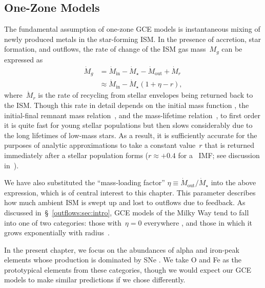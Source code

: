 \subsection{One-Zone Models}
\label{outflows:sec:gce:onezone}
The fundamental assumption of one-zone GCE models is instantaneous
mixing of newly produced metals in the star-forming ISM.
In the presence of accretion, star formation, and outflows, the rate of
change of the ISM gas mass~$M_g$ can be expressed as
\begin{equation}\begin{split}
\dot{M}_g &= \dot{M}_\text{in} - \dot{M}_\star - \dot{M}_\text{out} +
\dot{M}_r
\\
&\approx \dot{M}_\text{in} - \dot{M}_\star(1 + \eta - r),
\label{outflows:eq:mdot-gas}
\end{split}\end{equation}
where~$\dot{M}_r$ is the rate of recycling from stellar envelopes being
returned back to the ISM.
Though this rate in detail depends on the initial mass function
\citep[IMF; e.g.,][]{Salpeter1955, Kroupa2001, Chabrier2003}, the
initial-final remnant mass relation~\citep[e.g.,][]{Kalirai2008}, and the
mass-lifetime relation~\citep[e.g.,][]{Larson1974, Maeder1989, Hurley2000},
to first order it is quite fast for young stellar populations but then
slows considerably due to the long lifetimes of low-mass stars.
As a result, it is sufficiently accurate for the purposes of analytic
approximations to take a constant value~$r$ that is returned immediately
after a stellar population forms ($r \approx +0.4$ for
a~\citealt{Kroupa2001} IMF; see discussion in~\citealt{Weinberg2017b}).
\par
We have also substituted the ``mass-loading factor''
$\eta \equiv \dot{M}_\text{out} / \dot{M}_\star$ into the above expression,
which is of central interest to this chapter.
This parameter describes how much ambient ISM is swept up and lost to outflows
due to feedback.
As discussed in~\S~\ref{outflows:sec:intro}, GCE models of the Milky Way
tend to fall into one of two categories: those with~$\eta = 0$ everywhere
\citep[e.g.,][]{Spitoni2021}, and those in which it grows exponentially
with radius~\citep[e.g.,][]{Johnson2021}.
\par
In the present chapter, we focus on the abundances of alpha and
iron-peak elements whose production is dominated by SNe
\citep[e.g.,][]{Johnson2019}.
We take O and Fe as the prototypical elements from these categories, though
we would expect our GCE models to make similar predictions if we chose
differently.
